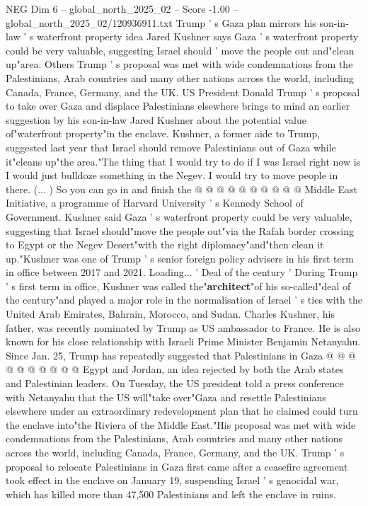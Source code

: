 \begin{textsample}{NEG Dim 6 – global\_north\_2025\_02 – Score -1.00 – global\_north\_2025\_02/120936911.txt}  \label{ex:f6_neg_080}
Trump ' s Gaza plan mirrors his son-in-law ' s waterfront property idea Jared Kushner says Gaza ' s waterfront property could be very valuable, suggesting Israel should ' move the people out and"clean up"area.
Others Trump ' s proposal was met with wide condemnations from the Palestinians, Arab countries and many other nations across the world, including Canada, France, Germany, and the UK.
US President Donald Trump ' s proposal to take over Gaza and displace Palestinians elsewhere brings to mind an earlier suggestion by his son-in-law Jared Kushner about the potential value of"waterfront property"in the enclave.
Kushner, a former aide to Trump, suggested last year that Israel should remove Palestinians out of Gaza while it"cleans up"the area."The thing that I would try to do if I was Israel right now is I would just bulldoze something in the Negev.
I would try to move people in there. (... ) So you can go in and finish the @ @ @ @ @ @ @ @ @ @ Middle East Initiative, a programme of Harvard University ' s Kennedy School of Government.
Kushner said Gaza ' s waterfront property could be very valuable, suggesting that Israel should"move the people out"via the Rafah border crossing to Egypt or the Negev Desert"with the right diplomacy"and"then clean it up."Kushner was one of Trump ' s senior foreign policy advisers in his first term in office between 2017 and 2021.
Loading... ' Deal of the century ' During Trump ' s first term in office, Kushner was called the"\textbf{architect}"of his so-called"deal of the century"and played a major role in the normalisation of Israel ' s ties with the United Arab Emirates, Bahrain, Morocco, and Sudan.
Charles Kushner, his father, was recently nominated by Trump as US ambassador to France.
He is also known for his close relationship with Israeli Prime Minister Benjamin Netanyahu.
Since Jan. 25, Trump has repeatedly suggested that Palestinians in Gaza @ @ @ @ @ @ @ @ @ @ Egypt and Jordan, an idea rejected by both the Arab states and Palestinian leaders.
On Tuesday, the US president told a press conference with Netanyahu that the US will"take over"Gaza and resettle Palestinians elsewhere under an extraordinary redevelopment plan that he claimed could turn the enclave into"the Riviera of the Middle East."His proposal was met with wide condemnations from the Palestinians, Arab countries and many other nations across the world, including Canada, France, Germany, and the UK.
Trump ' s proposal to relocate Palestinians in Gaza first came after a ceasefire agreement took effect in the enclave on January 19, suspending Israel ' s genocidal war, which has killed more than 47,500 Palestinians and left the enclave in ruins.

\end{textsample}
